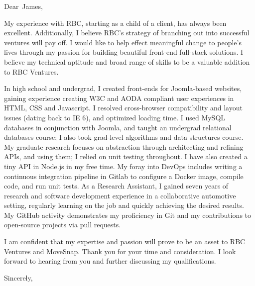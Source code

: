 \documentclass[
fontsize=12pt,
paper=letter,
parskip=half,
enlargefirstpage=on,    %
fromalign=right,        %
fromphone=on,           %
fromemail=on,
fromrule=aftername,     %
addrfield=off,           %
backaddress=off,         %
subject=beforeopening,  %
locfield=narrow,        %
foldmarks=off,           %
]{scrlttr2}
\renewcommand{\\}{\ {\large\textperiodcentered}\ }
\begin{document}

\begin{letter}{}


\opening{Dear~James,}


My experience with RBC, starting as a child of a client, has always been excellent.
Additionally, I believe RBC's strategy of branching out into successful ventures will pay off.
I would like to help effect meaningful change to people's lives through my passion for building beautiful front-end full-stack solutions.
I believe my technical aptitude and broad range of skills to be a valuable addition to RBC Ventures.

In high school and undergrad, I created front-ends for Joomla-based websites, gaining experience creating W3C and AODA compliant user experiences in HTML, CSS and Javascript.
I resolved cross-browser compatibility and layout issues (dating back to IE 6), and optimized loading time.
I used MySQL databases in conjunction with Joomla, and taught an undergrad relational databases course; I also took grad-level algorithms and data structures course.
My graduate research focuses on abstraction through architecting and refining APIs, and using them; I relied on unit testing throughout.
I have also created a tiny API in Node.js in my free time.
My foray into {\nobreak DevOps} includes writing a continuous integration pipeline in Gitlab to configure a Docker image, compile code, and run unit tests.
As a Research Assistant, I gained seven years of research and software development experience in a collaborative automotive setting, regularly learning on the job and quickly achieving the desired results.
My GitHub activity demonstrates my proficiency in Git and my contributions to open-source projects via pull requests.

I am confident that my expertise and passion will prove to be an asset to RBC Ventures and MoveSnap.
Thank you for your time and consideration.
I look forward to hearing from you and further discussing my qualifications.
\closing{Sincerely,}


\end{letter}
\end{document}
